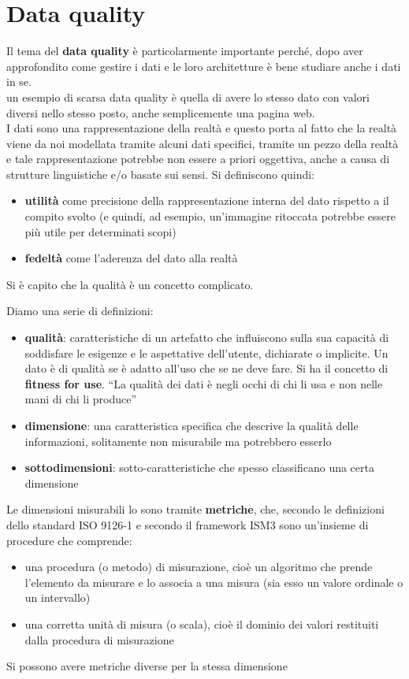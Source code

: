 \documentclass[a4paper,12pt, oneside]{book}
\begin{document}
\chapter{Data quality}
Il tema del \textbf{data quality} è particolarmente importante perché, dopo aver
approfondito come gestire i dati e le loro architetture è bene studiare anche i
dati in se. \\
un esempio di scarsa data quality è quella di avere lo stesso dato con valori
diversi nello stesso posto, anche semplicemente una pagina web.\\
I dati sono una rappresentazione della realtà e questo porta al fatto che la
realtà viene da noi modellata tramite alcuni dati specifici, tramite un pezzo
della realtà e tale rappresentazione potrebbe non essere a priori oggettiva,
anche a causa di strutture linguistiche e/o basate sui sensi. Si definiscono
quindi:
\begin{itemize}
  \item \textbf{utilità} come precisione della rappresentazione interna
  del dato rispetto a il compito svolto (e quindi, ad esempio, un'immagine
  ritoccata potrebbe essere più utile per determinati scopi)
  \item \textbf{fedeltà} come l'aderenza del dato alla realtà
\end{itemize}
Si è capito che la qualità è un concetto complicato.
\begin{definizione}
  Diamo una serie di definizioni:
  \begin{itemize}
    \item \textbf{qualità}: caratteristiche di un artefatto che influiscono
    sulla sua capacità di soddisfare le esigenze e le aspettative dell'utente,
    dichiarate o implicite. Un dato è di qualità se è adatto all'uso che se ne
    deve fare. Si ha il concetto di \textbf{fitness for use}. ``La qualità dei
    dati è negli occhi di chi li usa e non nelle mani di chi li produce''
    \item \textbf{dimensione}: una caratteristica specifica che descrive la
    qualità delle informazioni, solitamente non misurabile ma potrebbero esserlo
    \item \textbf{sottodimensioni}: sotto-caratteristiche che spesso
    classificano una certa dimensione
  \end{itemize}
  Le dimensioni misurabili lo sono tramite \textbf{metriche}, che, secondo le
  definizioni dello standard ISO 9126-1 e secondo il framework ISM3 sono
  un'insieme di procedure che comprende:
  \begin{itemize}
    \item una procedura (o metodo) di misurazione, cioè un algoritmo che prende
    l'elemento da misurare e lo associa a una misura (sia esso un valore
    ordinale o un intervallo)
    \item una corretta unità di misura (o scala), cioè
    il dominio dei valori restituiti dalla procedura di misurazione
  \end{itemize}
  Si possono avere metriche diverse per la stessa dimensione 
\end{definizione}
\end{document}
